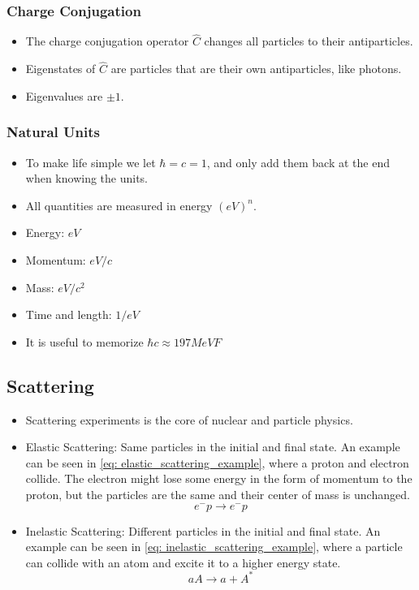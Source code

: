 \subsubsection{Charge Conjugation}
\begin{itemize}
    \item The charge conjugation operator $\hat{C}$ changes all particles to their antiparticles.
    \item Eigenstates of $\hat{C}$ are particles that are their own antiparticles, like photons. 
    \item Eigenvalues are $\pm 1$. 
\end{itemize}

\subsubsection{Natural Units}
\begin{itemize}
    \item To make life simple we let $ℏ = c = 1$, and only add them back at the end when knowing the units. 
    \item All quantities are measured in energy $\left(eV\right)^{n}$. 
    \item Energy: $eV$
    \item Momentum: $eV / c$
    \item Mass: $eV / c^2$
    \item Time and length: $1 / eV$
    \item It is useful to memorize $ℏc ≈ 197 MeVF$
\end{itemize}

\subsection{Scattering}
\begin{itemize}
    \item Scattering experiments is the core of nuclear and particle physics. 
    \item Elastic Scattering: Same particles in the initial and final state. An example can be seen in \cref{eq: elastic_scattering_example}, where a proton and electron collide. The electron might lose some energy in the form of momentum to the proton, but the particles are the same and their center of mass is unchanged. 
    \begin{equation}\label{eq: elastic_scattering_example}
        e^{-} p → e^{-} p
    \end{equation}
    \item Inelastic Scattering: Different particles in the initial and final state. An example can be seen in \cref{eq: inelastic_scattering_example}, where a particle can collide with an atom and excite it to a higher energy state.
    \begin{equation}\label{eq: inelastic_scattering_example}
        a A → a + A^{*}
    \end{equation}
\end{itemize}

